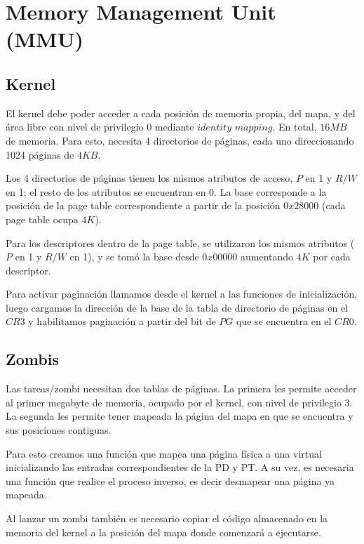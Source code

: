 \documentclass[a4paper]{article}
\begin{document}
\section{Memory Management Unit (MMU)}
\subsection {Kernel}
El kernel debe poder acceder a cada posición de memoria propia, del mapa, y del área libre con nivel de privilegio 0 mediante $identity$ $mapping$. En total, $16 MB$ de memoria. Para esto, necesita 4 directorios de páginas, cada uno direccionando 1024 páginas de $4 KB$. 

Los 4 directorios de páginas tienen los mismos atributos de acceso, $P$ en 1 y $R/W$ en 1; el resto de los atributos se encuentran en 0. La base corresponde a la posición de la page table correspondiente a partir de la posición $0x28000$ (cada page table ocupa $4K$).

Para los descriptores dentro de la page table, se utilizaron los mismos atributos ($P$ en 1 y $R/W$ en 1), y se tomó la base desde $0x00000$ aumentando $4K$ por cada descriptor.

Para activar paginación llamamos desde el kernel a las funciones de inicialización, luego cargamos la dirección de la base de la tabla de directorio de páginas en el $CR3$ y habilitamos paginación a partir del bit de $PG$ que se encuentra en el $CR0$.

\subsection {Zombis}
Las tareas/zombi necesitan dos tablas de páginas. La primera les permite acceder al primer megabyte de memoria, ocupado por el kernel, con nivel de privilegio 3. La segunda les permite tener mapeada la página del mapa en que se encuentra y sus posiciones contiguas. %

Para esto creamos una función que mapea una página física a una virtual inicializando las entradas correspondientes de la PD y PT. A su vez, es necesaria una función que realice el proceso inverso, es decir desmapear una página ya mapeada.  %

Al lanzar un zombi también es necesario copiar el código almacenado en la memoria del kernel a la posición del mapa donde comenzará a ejecutarse.
\end{document}
